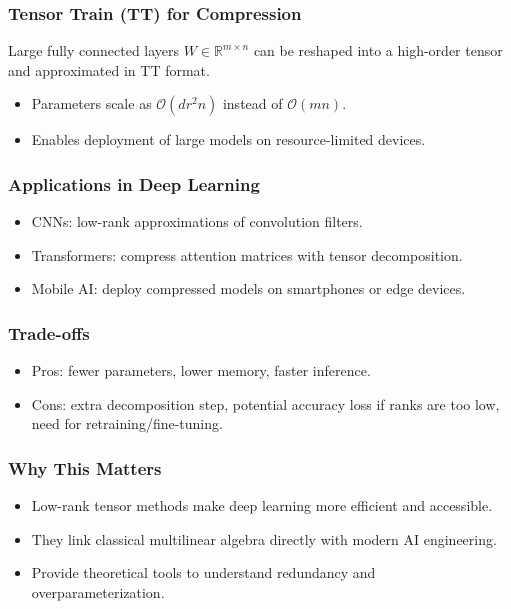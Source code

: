 \documentclass[
  letterpaper,
  DIV=11,
  numbers=noendperiod]{scrreprt}
\providecommand{\tightlist}{%
  \setlength{\itemsep}{0pt}\setlength{\parskip}{0pt}}
\begin{document}
\subsubsection{Tensor Train (TT) for
Compression}\label{tensor-train-tt-for-compression}

Large fully connected layers \(W \in \mathbb{R}^{m \times n}\) can be
reshaped into a high-order tensor and approximated in TT format.

\begin{itemize}
\tightlist
\item
  Parameters scale as \(\mathcal{O}(d r^2 n)\) instead of
  \(\mathcal{O}(mn)\).
\item
  Enables deployment of large models on resource-limited devices.
\end{itemize}

\subsubsection{Applications in Deep
Learning}\label{applications-in-deep-learning}

\begin{itemize}
\tightlist
\item
  CNNs: low-rank approximations of convolution filters.
\item
  Transformers: compress attention matrices with tensor decomposition.
\item
  Mobile AI: deploy compressed models on smartphones or edge devices.
\end{itemize}

\subsubsection{Trade-offs}\label{trade-offs}

\begin{itemize}
\tightlist
\item
  Pros: fewer parameters, lower memory, faster inference.
\item
  Cons: extra decomposition step, potential accuracy loss if ranks are
  too low, need for retraining/fine-tuning.
\end{itemize}

\subsubsection{Why This Matters}\label{why-this-matters-49}

\begin{itemize}
\tightlist
\item
  Low-rank tensor methods make deep learning more efficient and
  accessible.
\item
  They link classical multilinear algebra directly with modern AI
  engineering.
\item
  Provide theoretical tools to understand redundancy and
  overparameterization.
\end{itemize}
\end{document}
